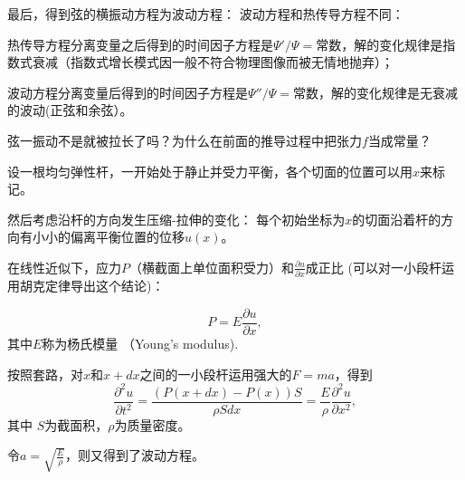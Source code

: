 \documentclass[CJK]{beamer}
\begin{document}
\begin{frame}
\bch
最后，得到弦的横振动方程为波动方程：
波动方程和热传导方程不同：
\bitem
\item{热传导方程分离变量之后得到的时间因子方程是$\Psi'/\Psi =$常数，解的变化规律是指数式衰减（指数式增长模式因一般不符合物理图像而被无情地抛弃）；}
\item{
  波动方程分离变量后得到的时间因子方程是$\Psi''/\Psi =$常数，解的变化规律是无衰减的波动(正弦和余弦）。}
  \eitem

\ech
\end{frame}


\begin{frame}
\bch
{}

弦一振动不是就被拉长了吗？为什么在前面的推导过程中把张力$f$当成常量？
\ech
\end{frame}


\begin{frame}
\bch
设一根均匀弹性杆，一开始处于静止并受力平衡，各个切面的位置可以用$x$来标记。

然后考虑沿杆的方向发生压缩-拉伸的变化： 每个初始坐标为$x$的切面沿着杆的方向有小小的偏离平衡位置的位移$u(x)$。


在线性近似下，应力$P$（横截面上单位面积受力）和$\frac{\partial u}{\partial x}$成正比 (可以对一小段杆运用胡克定律导出这个结论)：

$$ P = E\frac{\partial u}{\partial x},$$
其中$E$称为杨氏模量 （Young's modulus).

\ech
\end{frame}



\begin{frame}
\bch

按照套路，对$x$和$x+dx$之间的一小段杆运用强大的$F=ma$，得到
$$ \frac{\partial^2u}{\partial t^2} = \frac{(P(x+dx)-P(x))S}{\rho S dx} = \frac{E}{\rho} \frac{\partial^2u}{\partial x^2},$$
其中 $S$为截面积，$\rho$为质量密度。

\skipline

令$a = \sqrt{\frac{E}{\rho}}$，则又得到了波动方程。


\ech
\end{frame}
\end{document}
